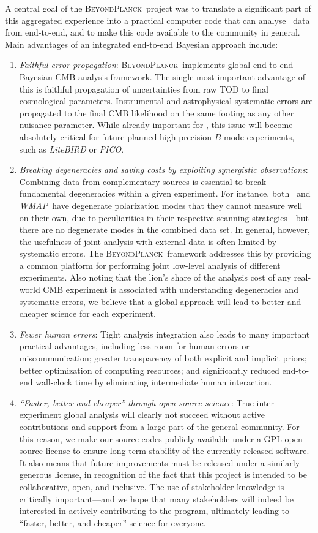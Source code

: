\documentclass[onecolumn]{aa}
\def\WMAP{\emph{WMAP}}
\newcommand{\BP}{\textsc{BeyondPlanck}}
\begin{document}
A central goal of the \BP\ project was to translate a significant part
of this aggregated experience into a practical computer code that can
analyse \Planck\ data from end-to-end, and to make this code available
to the community in general. Main advantages of an integrated
end-to-end Bayesian approach include:
\begin{enumerate}
\item \emph{Faithful error propagation}: \BP\ implements global
  end-to-end Bayesian CMB analysis framework. The single most
  important advantage of this is faithful propagation of uncertainties
  from raw TOD to final cosmological parameters. Instrumental and
  astrophysical systematic errors are propagated to the final CMB
  likelihood on the same footing as any other nuisance
  parameter. While already important for \Planck, this issue will
  become absolutely critical for future planned high-precision
  $B$-mode experiments, such as \emph{LiteBIRD} or \emph{PICO}.
\item \emph{Breaking degeneracies and saving costs by exploiting
  synergistic observations}: Combining data from complementary sources is
  essential to break fundamental degeneracies within a given
  experiment. For instance, both \Planck\ and \WMAP\ have degenerate
  polarization modes that they cannot measure well on their own, due
  to peculiarities in their respective scanning strategies---but there
  are no degenerate modes in the combined data set. In general,
  however, the usefulness of joint analysis with external data is
  often limited by systematic errors. The \BP\ framework addresses
  this by providing a common platform for performing joint low-level
  analysis of different experiments. Also noting that the lion's share
  of the analysis cost of any real-world CMB experiment is associated
  with understanding degeneracies and systematic errors, we believe that a global approach
  will lead to better and cheaper science for each experiment.
\item \emph{Fewer human errors}: Tight analysis integration also leads
  to many important practical advantages, including less room for
  human errors or miscommunication; greater transparency of both
  explicit and implicit priors; better optimization of computing
  resources; and significantly reduced end-to-end wall-clock time by
  eliminating intermediate human interaction. 
\item \emph{``Faster, better and cheaper'' through open-source 
  science}: True inter-experiment global analysis will clearly not
  succeed without active contributions and support from a large part
  of the general community. For this reason, we make our source codes
  publicly available under a GPL open-source license to ensure
  long-term stability of the currently released software.  It
  also means that future improvements must be released under a
  similarly generous license, in recognition of the fact that this
  project is intended to be collaborative, open, and inclusive. The
  use of stakeholder knowledge is critically important---and we hope
  that many stakeholders will indeed be interested in actively
  contributing to the program, ultimately leading to ``faster, better,
  and cheaper'' science for everyone.
\end{enumerate}
\end{document}
